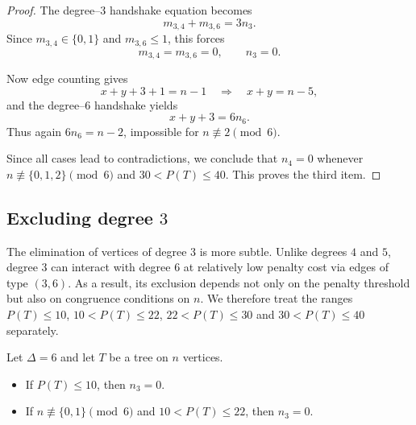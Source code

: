 \documentclass[preprint,12pt]{elsarticle}
\begin{document}
\begin{proof}
The degree--$3$ handshake equation becomes
\[
m_{3,4}+m_{3,6}=3n_3 .
\]
Since $m_{3,4}\in\{0,1\}$ and $m_{3,6}\le 1$, this forces
\[
m_{3,4}=m_{3,6}=0, \qquad n_3=0 .
\]

Now edge counting gives
\[
x+y+3+1=n-1 \quad\Rightarrow\quad x+y=n-5 ,
\]
and the degree--$6$ handshake yields
\[
x+y+3=6n_6 .
\]
Thus again $6n_6=n-2$, impossible for $n\not\equiv 2\pmod 6$.

\medskip
Since all cases lead to contradictions, we conclude that $n_4=0$ whenever
$n\not\equiv\{0,1,2\}\pmod 6$ and $30<P(T)\le 40$.  
This proves the third item.
\end{proof}

\subsection{Excluding degree $3$}
\label{subsec:no3}

The elimination of vertices of degree $3$ is more subtle. Unlike degrees $4$ and $5$,
degree $3$ can interact with degree $6$ at relatively low penalty cost via edges of
type $(3,6)$. As a result, its exclusion depends not only on the penalty threshold
but also on congruence conditions on $n$. We therefore treat the ranges $P(T)\le 10$,  $10<P(T)\le 22$,
$22<P(T)\le 30$ and $30<P(T)\le 40$ separately.



\medskip




\begin{lemma}
\label{lem:no3-threshold}
Let $\Delta=6$ and let $T$ be a tree on $n$ vertices.
\begin{itemize}
\item If $P(T)\le 10$, then $n_3=0$.
\item If $n\not\equiv \{0,1\} \pmod 6$ and $10<P(T)\le 22$, then $n_3=0$.
\end{itemize}
\end{lemma}
\end{document}
